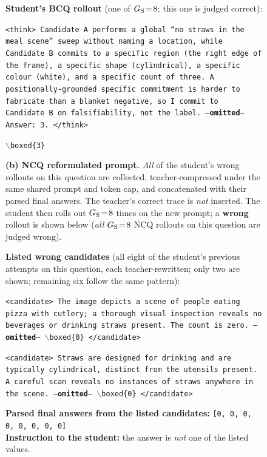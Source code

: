 \begin{figure}[!p]
\begin{prompttemplatefig}
\textbf{Student's BCQ rollout} (one of $G_{\rm S}\!=\!8$; this one is judged correct):

\smallskip
\texttt{<think> Candidate~A performs a global ``no straws in the meal scene'' sweep without naming a location, while Candidate~B commits to a specific region (the right edge of the frame), a specific shape (cylindrical), a specific colour (white), and a specific count of three. A positionally-grounded specific commitment is harder to fabricate than a blanket negative, so I commit to Candidate~B on falsifiability, not the label. ---\textbf{omitted}--- Answer: 3. </think>}

\smallskip
\texttt{$\backslash$boxed\{3\}} \quad \textcolor{posgain}{\checkmark}
\end{prompttemplatefig}

\vspace{1pt}\noindent\textbf{(b) NCQ reformulated prompt.} \emph{All} of the student's wrong rollouts on this question are collected, teacher-compressed under the same shared prompt and token cap, and concatenated with their parsed final answers. The teacher's correct trace is \emph{not} inserted. The student then rolls out $G_{\rm S}\!=\!8$ times on the new prompt; a \textbf{wrong} rollout is shown below (\emph{all} $G_{\rm S}\!=\!8$ NCQ rollouts on this question are judged wrong).

\begin{negcandidatebox}
\textbf{Listed wrong candidates} (all eight of the student's previous attempts on this question, each teacher-rewritten; only two are shown; remaining six follow the same pattern):

\smallskip
\texttt{<candidate> The image depicts a scene of people eating pizza with cutlery; a thorough visual inspection reveals no beverages or drinking straws present. The count is zero. ---\textbf{omitted}--- $\backslash$boxed\{0\} </candidate>}

\smallskip
\texttt{<candidate> Straws are designed for drinking and are typically cylindrical, distinct from the utensils present. A careful scan reveals no instances of straws anywhere in the scene. ---\textbf{omitted}--- $\backslash$boxed\{0\} </candidate>}

\smallskip
\textbf{Parsed final answers from the listed candidates:} \texttt{[0, 0, 0, 0, 0, 0, 0, 0]} \\
\textbf{Instruction to the student:} the answer is \emph{not} one of the listed values.
\end{negcandidatebox}


\end{figure}
